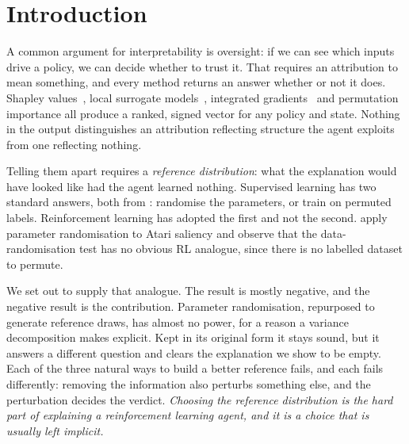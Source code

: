 \documentclass[10pt,twocolumn]{article}
\begin{document}
\section{Introduction}

A common argument for interpretability is oversight: if we can see which inputs
drive a policy, we can decide whether to trust it. That requires an attribution
to mean something, and every method returns an answer whether or not it does.
Shapley values~\citep{shapley1953value,lundberg2017unified}, local surrogate
models~\citep{ribeiro2016lime}, integrated
gradients~\citep{sundararajan2017axiomatic} and permutation importance all
produce a ranked, signed vector for any policy and state. Nothing in the output
distinguishes an attribution reflecting structure the agent exploits from one
reflecting nothing.

Telling them apart requires a \emph{reference distribution}: what the
explanation would have looked like had the agent learned nothing. Supervised
learning has two standard answers, both from \citet{adebayo2018sanity}:
randomise the parameters, or train on permuted labels. Reinforcement learning
has adopted the first and not the second.
\citet{huber2022benchmarking} apply parameter randomisation to Atari saliency
and observe that the data-randomisation test has no obvious RL analogue, since
there is no labelled dataset to permute.

We set out to supply that analogue. The result is mostly negative, and the
negative result is the contribution. Parameter randomisation, repurposed to
generate reference draws, has almost no power, for a reason a variance
decomposition makes explicit. Kept in its original form it stays sound, but it
answers a different question and clears the explanation we show to be empty. Each of the three natural ways to build a better reference fails, and each
fails differently: removing the information also perturbs something else, and
the perturbation decides the verdict. \emph{Choosing the reference distribution is the hard part of
explaining a reinforcement learning agent, and it is a choice that is usually
left implicit.}
\end{document}
